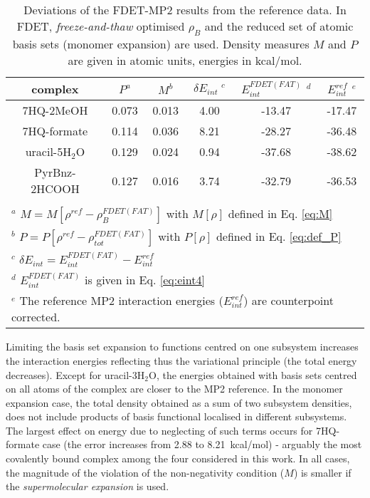 \documentclass[journal=jctcce,manuscript=article]{achemso}
\begin{document}
\begin{table*}
{
\begin{center}
\begin{tabular}{|c|c|c|c|c|c|}
\hline
 complex & $P^a$ & $M^b$ & $\delta E_{int}\;^c$&$E^{FDET(FAT)}_{int}$ $^d$ &$E_{int}^{ref}$ $^e$ \\ \hline
7HQ-2MeOH &0.073& 0.013 & 4.00 &-13.47 & -17.47 \\ \hline
7HQ-formate &0.114& 0.036 &  8.21&-28.27 & -36.48 \\ \hline
uracil-5H$_2$O &0.129&  0.024 & 0.94&-37.68 & -38.62 \\ \hline
PyrBnz-2HCOOH  &0.127& 0.016  & 3.74&-32.79 &  -36.53 \\ \hline
\multicolumn{6}{c}{ } \\
\multicolumn{6}{l}{$^a$ $M=M[\rho^{ref} - \rho^{FDET(FAT)}_{B}]$ with $M[\rho]$ defined in Eq. \ref{eq:M}}\\
\multicolumn{6}{l}{$^b$ $P=P[\rho^{ref} - \rho_{tot}^{FDET(FAT)}]$ with $P[\rho]$ defined in Eq. \ref{eq:def_P}}\\
\multicolumn{6}{l}{$^c$ $\delta E_{int}=E^{FDET(FAT)}_{int}-E_{int}^{ref}$} \\
\multicolumn{6}{l}{$^d$ $E^{FDET(FAT)}_{int}$ is given in Eq. \ref{eq:eint4}}\\
\multicolumn{6}{l}{$^e$ The reference MP2 interaction energies ($E_{int}^{ref}$) are counterpoint corrected.}
\end{tabular}
\end{center}
}%
\caption{Deviations of the FDET-MP2 results from the reference data.  In FDET, \textit{freeze-and-thaw} optimised $\rho_B$ and the reduced set of atomic basis sets (monomer  expansion) are used. Density measures $M$ and $P$ are given in atomic units, energies in kcal/mol.
}
\label{table:ME_FAT}
\end{table*}

Limiting the basis set expansion to functions centred on one subsystem increases the interaction energies reflecting thus the variational principle (the total energy decreases). Except for uracil-3H$_2$O, the energies obtained with basis sets centred on all atoms of the complex are closer to the MP2 reference. In the monomer expansion case, the total density obtained as a sum of two subsystem densities, does not include products of  basis functional localised in different subsystems. The largest effect on energy due to neglecting of such terms occurs for 7HQ-formate case (the error increases from 2.88 to 8.21~kcal/mol) - arguably the most covalently bound complex among the four considered in this work. In all cases, the magnitude of the violation of the non-negativity condition ($M$)  is smaller if the {\it supermolecular expansion} is used. 
\end{document}
